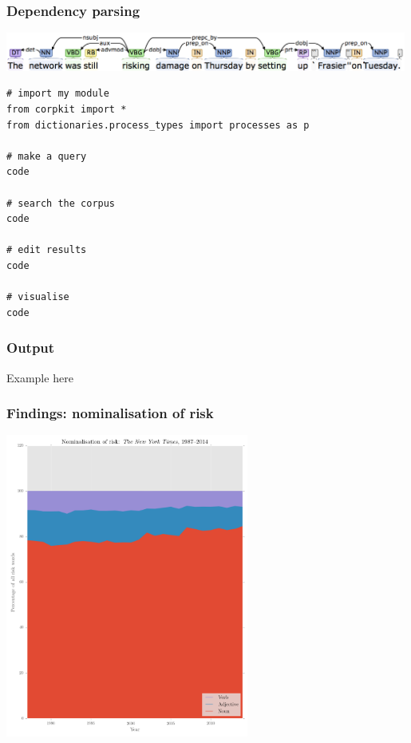 \documentclass{beamer}       %
\begin{document}

\begin{frame}
    \frametitle{Dependency parsing}
    \centering
    \includegraphics[width=0.99\textwidth]{../images/depparse}
\end{frame}


\begin{frame}[fragile]
    \begin{verbatim}
# import my module
from corpkit import *
from dictionaries.process_types import processes as p

# make a query
code

# search the corpus
code

# edit results
code

# visualise
code
    \end{verbatim}
\end{frame}

\begin{frame}
    \frametitle{Output}
    \centering
    Example here
\end{frame}


\begin{frame}
    \frametitle{Findings: nominalisation of risk}
    \centering
    \includegraphics[width=0.60\textwidth]{../images/nominalisation-of-risk-emphthe-new-york-times-19872014}
\end{frame}
\end{document}
